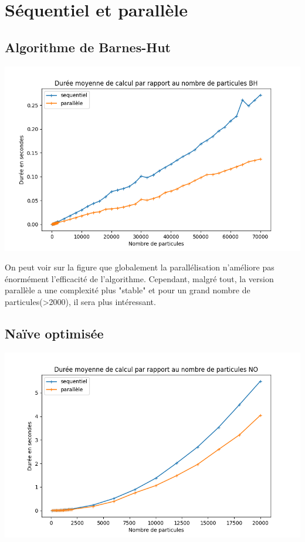 \section{Séquentiel et parallèle}

\subsection{Algorithme de Barnes-Hut}
\begin{center}
\includegraphics[scale=0.6]{./resultats/comparison_BH.png}
\captionsetup{hypcap=false}
\label{fig11}
\end{center}


On peut voir sur la figure que globalement la parallélisation n'améliore pas énormément l'efficacité de l'algorithme. Cependant, malgré tout, la version parallèle a une complexité plus "stable" et pour un grand nombre de particules(>2000), il sera plus intéressant.

\subsection{Naïve optimisée}
\begin{center}
\includegraphics[scale=0.6]{./resultats/comparison_NO.png}
\captionsetup{hypcap=false}
\label{fig12}
\end{center}


